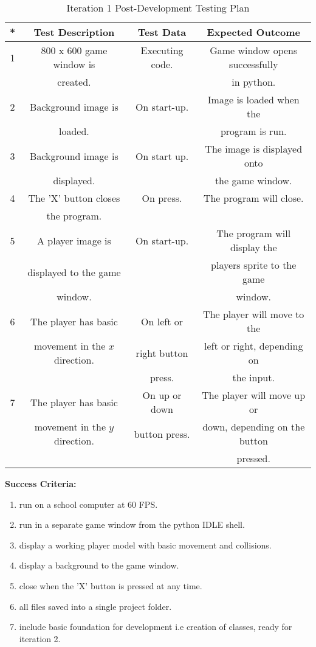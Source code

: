 \documentclass[12pt]{report}
\begin{document}
\begin{table}[H]
    \centering
    \begin{tabular}{|c|c|c|c|}
    \hline
    \textbf{*} & \textbf{Test Description} & \textbf{Test Data} & \textbf{Expected Outcome}\\
    \hline
    1 & 800 x 600 game window is & Executing code. & Game window opens successfully\\
    & created. & & in python.\\
    \hline
    2 & Background image is & On start-up. & Image is loaded when the\\
      & loaded.              &             & program is run. \\
    \hline
    3 & Background image is & On start up. & The image is displayed onto\\
    & displayed. & & the game window. \\
    \hline
    4 & The 'X' button closes & On press. & The program will close.\\
    & the program. & & \\
    \hline
    5 & A player image is & On start-up. & The program will display the \\
    & displayed to the game & & players sprite to the game \\
    & window. & & window.\\
    \hline
    6 & The player has basic & On left or & The player will move to the\\
    & movement in the $x$ direction. & right button & left or right, depending on \\
    & & press. & the input.\\
    \hline
    7 & The player has basic & On up or down & The player will move up or\\
    & movement in the $y$ direction. & button press. & down, depending on the button\\
    & & & pressed. \\
    \hline
    \end{tabular}
    \caption{Iteration 1 Post-Development Testing Plan}
    \label{TestTable}
\end{table}

\textbf{Success Criteria:}
\begin{enumerate}
    \item run on a school computer at 60 FPS.
    \item run in a separate game window from the python IDLE shell.
    \item display a working player model with basic movement and collisions.
    \item display a background to the game window.
    \item close when the 'X' button is pressed at any time.
    \item all files saved into a single project folder.
    \item include basic foundation for development i.e creation of classes, ready for iteration 2.
\end{enumerate}
\end{document}
